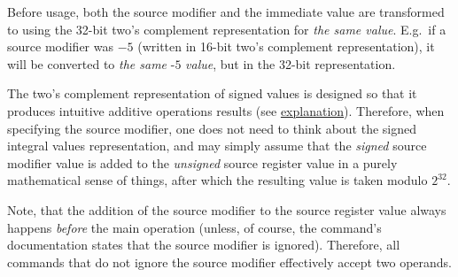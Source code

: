 Before usage, both the source modifier and the immediate value are transformed
to  using the 32-bit two's complement representation for
\textit{the same value}.
E.g.\ if a source modifier was $-5$ (written in 16-bit two's complement
representation), it will be converted to \textit{the same} $\textit{-5}$
\textit{value}, but in the 32-bit representation.

The two's complement representation of signed values is designed so that it
produces intuitive additive operations results
(see \href{https://en.wikipedia.org/wiki/Two\%27s_complement#Addition}
{explanation}).
Therefore, when specifying the source modifier, one does not need to think about
the signed integral values representation, and may simply assume that
the \textit{signed} source modifier value is added to the \textit{unsigned}
source register value in a purely mathematical sense of things, after which
the resulting value is taken modulo $2^{32}$.

Note, that the addition of the source modifier to the source register value
always happens \textit{before} the main operation (unless, of course,
the command's documentation states that the source modifier is ignored).
Therefore, all  commands that do not ignore the source modifier
effectively accept two  operands.
